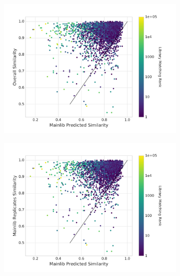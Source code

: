 \begin{figure}[h]
    \centering
    \begin{subfigure}[b]{0.48\linewidth}
        \includegraphics[width=\linewidth]{./mainlib_predicted_overall_similarity.png}
        \caption{}
    \end{subfigure}
    \begin{subfigure}[b]{0.48\linewidth}
        \includegraphics[width=\linewidth]{./main_predicted_main_replicates.png}
        \caption{}
    \end{subfigure}
    \\
    \begin{subfigure}[b]{0.48\linewidth}

\end{subfigure}
\end{figure}
